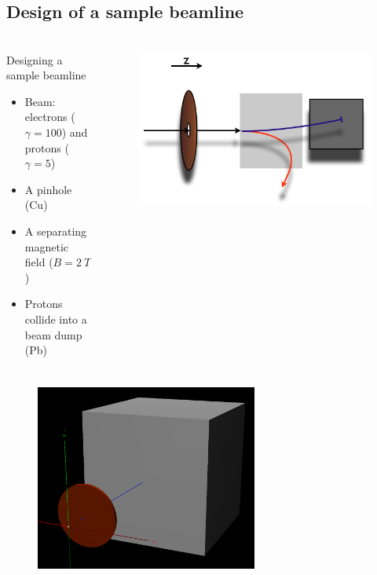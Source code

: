 \documentclass{beamer}
\newcommand{\ident}{\thesection.\thesubsection}
\newcommand{\mysubsection}[1]{\subsection{#1}\label{\ident}}
\newcommand{\ftitle}{\frametitle{\nameref{\ident}}}
\begin{document}
\mysubsection{Design of a sample beamline}

\begin{frame}
	\ftitle
	\begin{columns}
		\begin{column}{6cm}
			\begin{block}{Designing a sample beamline}
				\begin{itemize}
					\item Beam: electrons ($\gamma = 100$) and protons ($\gamma = 5$)
					\item A pinhole (Cu)
					\item A separating magnetic field ($B = 2~T$)
					\item Protons collide into a beam dump (Pb)
				\end{itemize}
			\end{block}
		\end{column}
		\begin{column}{5cm}
			\begin{figure}
				\includegraphics[width=\columnwidth]{img/beamline_setup}
			\end{figure}
		\end{column}
	\end{columns}
\end{frame}

\begin{frame}
	\ftitle
	\begin{figure}
		\includegraphics[width=0.65\textwidth]{img/beamline_setup_3d}
	\end{figure}
\end{frame}
\end{document}
